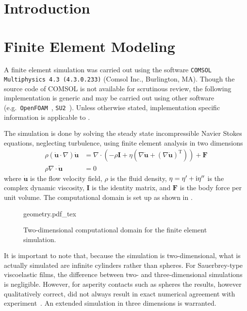 \section{Introduction}

\section{Finite Element Modeling} \label{sec:finiteelementdingus}
A finite element simulation was carried out using the software
\texttt{COMSOL Multiphysics 4.3 (4.3.0.233)} (Comsol Inc., Burlington, MA).
Though the source code of COMSOL is not available for scrutinous review,
the following implementation is generic and may be carried out using other
software (e.g.\ \texttt{OpenFOAM}~\cite{jasak2007openfoam},
\texttt{SU2}~\cite{palacios2013stanford}).  Unless otherwise stated,
implementation specific information is applicable to \comsol.

The simulation is done by solving the steady state incompressible Navier
Stokes equations, neglecting turbulence, using finite element analysis in
two dimensions
\begin{align}
 \rho\left(\mathbf{\dot{u}}\cdot \nabla\right)\mathbf{\dot{u}}
 &=\nabla \cdot \left( -\rho \mathbf{I} + \eta \left(\nabla \mathbf{\dot{u}} +
 \left( \nabla \mathbf{\dot{u}}\right)^\mathrm{T}\right)\right) + \mathbf{F}\\
 \rho \nabla \cdot \mathbf{\dot{u}} &= 0
\end{align}
where $\mathbf{\dot{u}}$ is the flow velocity field, $\rho$ is the fluid
density, $\eta = \eta^\prime + {\mathrm{i}}\eta^{\prime\prime}$ is the complex
dynamic viscosity, $\mathbf{I}$ is the identity matrix, and $\mathbf{F}$ is
the body force per unit volume.  The computational domain is set up as
shown in .
\begin{figure}[h]
 \centering
 {geometry.pdf_tex}
 \caption{Two-dimensional computational domain for the finite element simulation.}
\label{fig:compgeometry}
\end{figure}

It is important to note that, because the simulation is two-dimensional, what
is actually simulated are infinite cylinders rather than spheres.  For
Sauerbrey-type viscoelastic films, the difference between two- and
three-dimensional simulations is negligible.  However, for asperity contacts
such as spheres the results, however qualitatively correct, did not always
result in exact numerical agreement with experiment~\cite{Vittorias2010489}.
An extended simulation in three dimensions is warranted.

